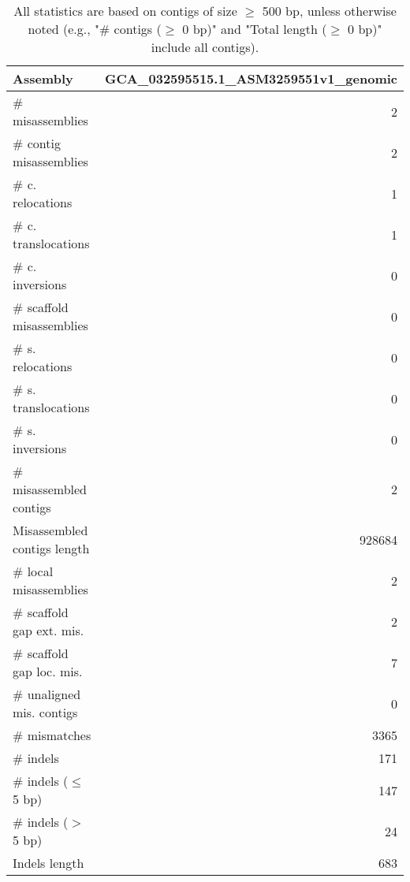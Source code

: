 \documentclass[12pt,a4paper]{article}
\begin{document}
\begin{table}[ht]
\begin{center}
\caption{All statistics are based on contigs of size $\geq$ 500 bp, unless otherwise noted (e.g., "\# contigs ($\geq$ 0 bp)" and "Total length ($\geq$ 0 bp)" include all contigs).}
\begin{tabular}{|l*{1}{|r}|}
\hline
Assembly & GCA\_032595515.1\_ASM3259551v1\_genomic \\ \hline
\# misassemblies & 2 \\ \hline
\hspace{2mm}\# contig misassemblies & 2 \\ \hline
\hspace{5mm}\# c. relocations & 1 \\ \hline
\hspace{5mm}\# c. translocations & 1 \\ \hline
\hspace{5mm}\# c. inversions & 0 \\ \hline
\hspace{2mm}\# scaffold misassemblies & 0 \\ \hline
\hspace{5mm}\# s. relocations & 0 \\ \hline
\hspace{5mm}\# s. translocations & 0 \\ \hline
\hspace{5mm}\# s. inversions & 0 \\ \hline
\# misassembled contigs & 2 \\ \hline
Misassembled contigs length & 928684 \\ \hline
\# local misassemblies & 2 \\ \hline
\# scaffold gap ext. mis. & 2 \\ \hline
\# scaffold gap loc. mis. & 7 \\ \hline
\# unaligned mis. contigs & 0 \\ \hline
\# mismatches & 3365 \\ \hline
\# indels & 171 \\ \hline
\hspace{5mm}\# indels ($\leq$ 5 bp) & 147 \\ \hline
\hspace{5mm}\# indels ($>$ 5 bp) & 24 \\ \hline
Indels length & 683 \\ \hline
\end{tabular}
\end{center}
\end{table}
\end{document}
